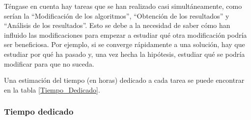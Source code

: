 Téngase en cuenta hay tareas que se han realizado casi simultáneamente, como serían la ``Modificación de los algoritmos'', ``Obtención de los resultados'' y ``Análisis de los resultados''. 
Esto se debe a la necesidad de saber cómo han influido las modificaciones para empezar a estudiar qué otra modificación podría ser beneficiosa. 
Por ejemplo, si se converge rápidamente a una solución, hay que estudiar por qué ha pasado y, una vez hecha la hipótesis, estudiar qué se podría modificar para que no suceda.

Una estimación del tiempo (en horas) dedicado a cada tarea se puede encontrar en la tabla \ref{Tiempo_Dedicado}.

\subsubsection{Tiempo dedicado}

